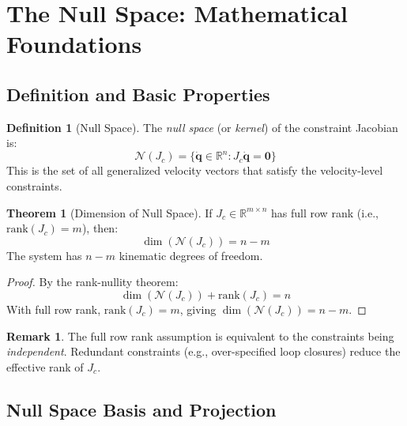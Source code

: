 \documentclass[11pt,a4paper]{article}
\theoremstyle{definition}
\newtheorem{definition}{Definition}[section]
\newtheorem{theorem}{Theorem}[section]
\newtheorem{remark}{Remark}[section]
\newcommand{\R}{\mathbb{R}}
\newcommand{\nullspace}{\mathcal{N}}
\newcommand{\Jc}{J_c}
\newcommand{\qvec}{\bm{q}}
\begin{document}
\section{The Null Space: Mathematical Foundations}

\subsection{Definition and Basic Properties}

\begin{definition}[Null Space]
The \emph{null space} (or \emph{kernel}) of the constraint Jacobian is:
\begin{equation}
    \boxed{\nullspace(\Jc) = \{\dot{\qvec} \in \R^n : \Jc \dot{\qvec} = \bm{0}\}}
\end{equation}
This is the set of all generalized velocity vectors that satisfy the velocity-level constraints.
\end{definition}

\begin{theorem}[Dimension of Null Space]
If $\Jc \in \R^{m \times n}$ has full row rank (i.e., $\text{rank}(\Jc) = m$), then:
\begin{equation}
    \dim(\nullspace(\Jc)) = n - m
\end{equation}
The system has $n - m$ kinematic degrees of freedom.
\end{theorem}

\begin{proof}
By the rank-nullity theorem:
\begin{equation}
    \dim(\nullspace(\Jc)) + \text{rank}(\Jc) = n
\end{equation}
With full row rank, $\text{rank}(\Jc) = m$, giving $\dim(\nullspace(\Jc)) = n - m$.
\end{proof}

\begin{remark}
The full row rank assumption is equivalent to the constraints being \emph{independent}. Redundant constraints (e.g., over-specified loop closures) reduce the effective rank of $\Jc$.
\end{remark}

\subsection{Null Space Basis and Projection}
\end{document}

